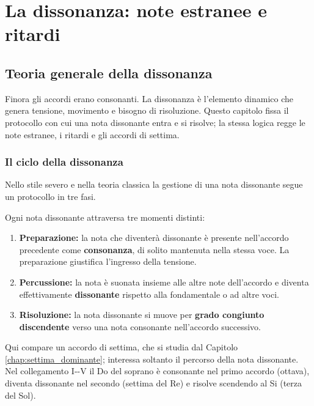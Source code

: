 \part{La dissonanza: note estranee e ritardi}

\chapter{Teoria generale della dissonanza}
\label{chap:teoria_dissonanza}

Finora gli accordi erano consonanti. La dissonanza è l'elemento dinamico che genera tensione, movimento e bisogno di risoluzione. Questo capitolo fissa il protocollo con cui una nota dissonante entra e si risolve; la stessa logica regge le note estranee, i ritardi e gli accordi di settima.

\section{Il ciclo della dissonanza}
\label{sec:ciclo_dissonanza}

Nello stile severo e nella teoria classica la gestione di una nota dissonante segue un protocollo in tre fasi.

\begin{regola}
	\label{reg:trattamento_dissonanza}
	Ogni nota dissonante attraversa tre momenti distinti:
	\begin{enumerate}
		\item \textbf{Preparazione:} la nota che diventerà dissonante è presente nell'accordo precedente come \textbf{consonanza}, di solito mantenuta nella stessa voce. La preparazione giustifica l'ingresso della tensione.
		\item \textbf{Percussione:} la nota è suonata insieme alle altre note dell'accordo e diventa effettivamente \textbf{dissonante} rispetto alla fondamentale o ad altre voci.
		\item \textbf{Risoluzione:} la nota dissonante si muove per \textbf{grado congiunto discendente} verso una nota consonante nell'accordo successivo.
	\end{enumerate}
\end{regola}

\begin{esempio}
	\label{ex:ciclo_dissonanza}
	Qui compare un accordo di settima, che si studia dal Capitolo \ref{chap:settima_dominante}; interessa soltanto il percorso della nota dissonante. Nel collegamento I--V il Do del soprano è consonante nel primo accordo (ottava), diventa dissonante nel secondo (settima del Re) e risolve scendendo al Si (terza del Sol).
\end{esempio}


